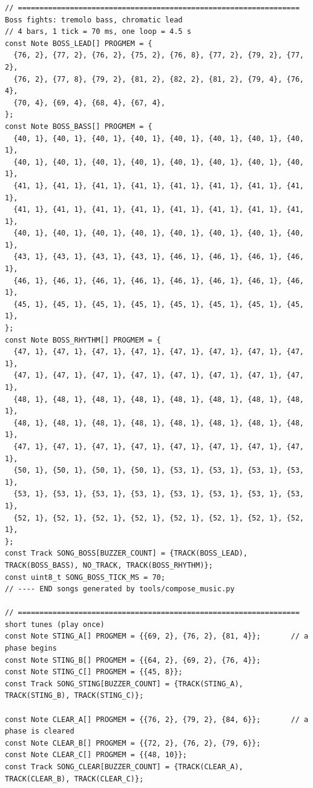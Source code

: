 \documentclass[11pt,a4paper]{article}
\begin{document}
\begin{lstlisting}[language=Arduino]
// ================================================================= Boss fights: tremolo bass, chromatic lead
// 4 bars, 1 tick = 70 ms, one loop = 4.5 s
const Note BOSS_LEAD[] PROGMEM = {
  {76, 2}, {77, 2}, {76, 2}, {75, 2}, {76, 8}, {77, 2}, {79, 2}, {77, 2},
  {76, 2}, {77, 8}, {79, 2}, {81, 2}, {82, 2}, {81, 2}, {79, 4}, {76, 4},
  {70, 4}, {69, 4}, {68, 4}, {67, 4},
};
const Note BOSS_BASS[] PROGMEM = {
  {40, 1}, {40, 1}, {40, 1}, {40, 1}, {40, 1}, {40, 1}, {40, 1}, {40, 1},
  {40, 1}, {40, 1}, {40, 1}, {40, 1}, {40, 1}, {40, 1}, {40, 1}, {40, 1},
  {41, 1}, {41, 1}, {41, 1}, {41, 1}, {41, 1}, {41, 1}, {41, 1}, {41, 1},
  {41, 1}, {41, 1}, {41, 1}, {41, 1}, {41, 1}, {41, 1}, {41, 1}, {41, 1},
  {40, 1}, {40, 1}, {40, 1}, {40, 1}, {40, 1}, {40, 1}, {40, 1}, {40, 1},
  {43, 1}, {43, 1}, {43, 1}, {43, 1}, {46, 1}, {46, 1}, {46, 1}, {46, 1},
  {46, 1}, {46, 1}, {46, 1}, {46, 1}, {46, 1}, {46, 1}, {46, 1}, {46, 1},
  {45, 1}, {45, 1}, {45, 1}, {45, 1}, {45, 1}, {45, 1}, {45, 1}, {45, 1},
};
const Note BOSS_RHYTHM[] PROGMEM = {
  {47, 1}, {47, 1}, {47, 1}, {47, 1}, {47, 1}, {47, 1}, {47, 1}, {47, 1},
  {47, 1}, {47, 1}, {47, 1}, {47, 1}, {47, 1}, {47, 1}, {47, 1}, {47, 1},
  {48, 1}, {48, 1}, {48, 1}, {48, 1}, {48, 1}, {48, 1}, {48, 1}, {48, 1},
  {48, 1}, {48, 1}, {48, 1}, {48, 1}, {48, 1}, {48, 1}, {48, 1}, {48, 1},
  {47, 1}, {47, 1}, {47, 1}, {47, 1}, {47, 1}, {47, 1}, {47, 1}, {47, 1},
  {50, 1}, {50, 1}, {50, 1}, {50, 1}, {53, 1}, {53, 1}, {53, 1}, {53, 1},
  {53, 1}, {53, 1}, {53, 1}, {53, 1}, {53, 1}, {53, 1}, {53, 1}, {53, 1},
  {52, 1}, {52, 1}, {52, 1}, {52, 1}, {52, 1}, {52, 1}, {52, 1}, {52, 1},
};
const Track SONG_BOSS[BUZZER_COUNT] = {TRACK(BOSS_LEAD), TRACK(BOSS_BASS), NO_TRACK, TRACK(BOSS_RHYTHM)};
const uint8_t SONG_BOSS_TICK_MS = 70;
// ---- END songs generated by tools/compose_music.py

// ================================================================= short tunes (play once)
const Note STING_A[] PROGMEM = {{69, 2}, {76, 2}, {81, 4}};       // a phase begins
const Note STING_B[] PROGMEM = {{64, 2}, {69, 2}, {76, 4}};
const Note STING_C[] PROGMEM = {{45, 8}};
const Track SONG_STING[BUZZER_COUNT] = {TRACK(STING_A), TRACK(STING_B), TRACK(STING_C)};

const Note CLEAR_A[] PROGMEM = {{76, 2}, {79, 2}, {84, 6}};       // a phase is cleared
const Note CLEAR_B[] PROGMEM = {{72, 2}, {76, 2}, {79, 6}};
const Note CLEAR_C[] PROGMEM = {{48, 10}};
const Track SONG_CLEAR[BUZZER_COUNT] = {TRACK(CLEAR_A), TRACK(CLEAR_B), TRACK(CLEAR_C)};


\end{lstlisting}
\end{document}
